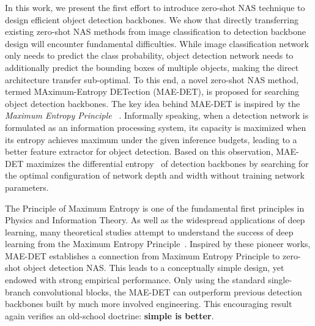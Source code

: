\documentclass[nohyperref]{article}
\theoremstyle{plain}
\theoremstyle{definition}
\theoremstyle{remark}
\begin{document}
In this work, we present the first effort to introduce zero-shot NAS technique to design efficient object detection backbones. We show that directly transferring existing zero-shot NAS methods from image classification to detection backbone design will encounter fundamental difficulties. While image classification network only needs to predict the class probability, object detection network needs to additionally predict the bounding boxes of multiple objects, making the direct architecture transfer sub-optimal. To this end, a novel zero-shot NAS method, termed MAximum-Entropy DETection (MAE-DET), is proposed for searching object detection backbones. The key idea behind MAE-DET is inspired by the \textit{Maximum Entropy Principle} ~\citep{jaynes57_InformationTheory,theory1,theory2,theory3}. Informally speaking, when a detection network is formulated as an information processing system, its capacity is maximized when its entropy achieves maximum under the given inference budgets, leading to a better feature extractor for object detection. Based on this observation, MAE-DET maximizes the differential entropy~\citep{shannon1948} of detection backbones by searching for the optimal configuration of network depth and width without training network parameters.

The Principle of Maximum Entropy is one of the fundamental first principles in Physics and Information Theory. As well as the widespread applications of deep learning, many theoretical studies attempt to understand the success of deep learning from the Maximum Entropy Principle~\citep{michael2018OnInformationBottleneckTheory,chanReduNetWhiteboxDeep2021,LearningDiverseNIPS2020}. Inspired by these pioneer works, MAE-DET establishes a connection from Maximum Entropy Principle to zero-shot object detection NAS. This leads to a conceptually simple design, yet endowed with strong empirical performance. Only using the standard single-branch convolutional blocks, the MAE-DET can outperform previous detection backbones built by much more involved engineering. This encouraging result again verifies an old-school doctrine: \textbf{simple is better}.
\end{document}
